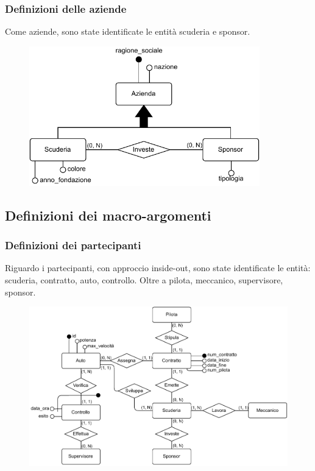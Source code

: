 \documentclass[11pt]{article}
\begin{document}
\subsubsection{Definizioni delle aziende}
Come aziende, sono state identificate le entità scuderia e sponsor. 
\begin{figure}[H]
    \centering
    \includegraphics[width=10cm]{../er/gare_aziende.pdf}
\end{figure}

\subsection{Definizioni dei macro-argomenti}
\subsubsection{Definizioni dei partecipanti}
Riguardo i partecipanti, con approccio inside-out, sono state identificate le entità: scuderia, contratto, auto, controllo. Oltre a pilota, meccanico, supervisore, sponsor.
\begin{figure}[H]
    \centering
    \includegraphics[width=15.5cm]{../er/gare_scuderie.pdf}
\end{figure}
\end{document}
